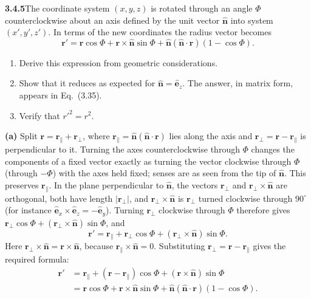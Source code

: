 \par\bigskip
\noindent\textbf{3.4.5}\quad The coordinate system $(x,y,z)$ is rotated
through an angle $\Phi$ counterclockwise about an axis defined by the unit
vector $\hat{\mathbf{n}}$ into system $(x',y',z')$. In terms of the new
coordinates the radius vector becomes
\[
\mathbf{r}'=\mathbf{r}\cos\Phi+\mathbf{r}\times\hat{\mathbf{n}}\sin\Phi
+\hat{\mathbf{n}}(\hat{\mathbf{n}}\cdot\mathbf{r})(1-\cos\Phi).
\]
\begin{enumerate}
\item[(a)] Derive this expression from geometric considerations.
\item[(b)] Show that it reduces as expected for
  $\hat{\mathbf{n}}=\hat{\mathbf{e}}_{z}$. The answer, in matrix form, appears
  in Eq.~(3.35).
\item[(c)] Verify that $r'^{2}=r^{2}$.
\end{enumerate}
\solution
\textbf{(a)} Split $\mathbf r=\mathbf r_\parallel+\mathbf r_\perp$, where
$\mathbf r_\parallel=\hat{\mathbf n}(\hat{\mathbf n}\cdot\mathbf r)$ lies
along the axis and $\mathbf r_\perp=\mathbf r-\mathbf r_\parallel$ is
perpendicular to it.
Turning the axes counterclockwise through $\Phi$ changes the components
of a fixed vector exactly as turning the vector clockwise through $\Phi$
(through $-\Phi$) with the axes held fixed; senses are as seen from the
tip of $\hat{\mathbf n}$. This preserves $\mathbf r_\parallel$.
In the plane perpendicular to $\hat{\mathbf n}$, the vectors
$\mathbf r_\perp$ and $\mathbf r_\perp\times\hat{\mathbf n}$ are
orthogonal, both have length $|\mathbf r_\perp|$, and
$\mathbf r_\perp\times\hat{\mathbf n}$ is $\mathbf r_\perp$ turned
clockwise through $90^\circ$ (for instance
$\hat{\mathbf e}_x\times\hat{\mathbf e}_z=-\hat{\mathbf e}_y$).
Turning $\mathbf r_\perp$ clockwise through $\Phi$ therefore gives
$\mathbf r_\perp\cos\Phi+(\mathbf r_\perp\times\hat{\mathbf n})\sin\Phi$,
and
\[
\mathbf r'=\mathbf r_\parallel
+\mathbf r_\perp\cos\Phi+(\mathbf r_\perp\times\hat{\mathbf n})\sin\Phi.
\]
Here $\mathbf r_\perp\times\hat{\mathbf n}=\mathbf r\times\hat{\mathbf n}$,
because $\mathbf r_\parallel\times\hat{\mathbf n}=0$.
Substituting $\mathbf r_\perp=\mathbf r-\mathbf r_\parallel$ gives the
required formula:
\[
\begin{aligned}
\mathbf r'&=\mathbf r_\parallel+(\mathbf r-\mathbf r_\parallel)\cos\Phi
+(\mathbf r\times\hat{\mathbf n})\sin\Phi\\
&=\mathbf r\cos\Phi+\mathbf r\times\hat{\mathbf n}\sin\Phi
+\hat{\mathbf n}(\hat{\mathbf n}\cdot\mathbf r)(1-\cos\Phi).
\end{aligned}
\]
